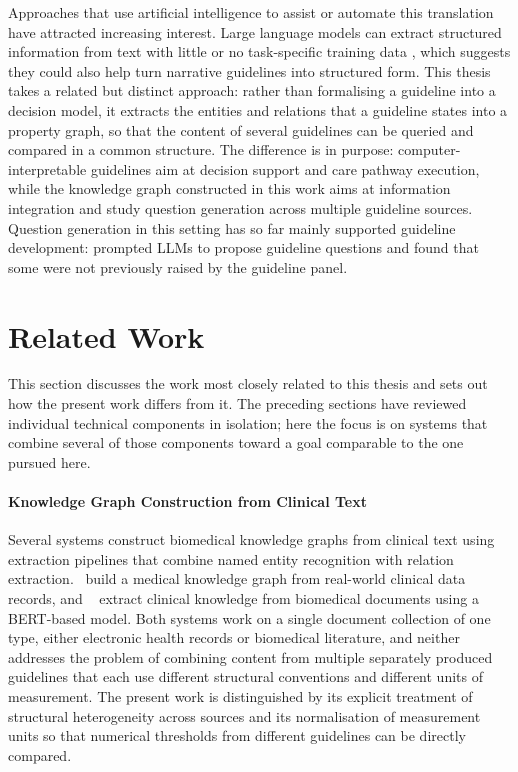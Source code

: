 Approaches that use artificial intelligence to assist or automate this
translation have attracted increasing interest. Large language models can
extract structured information from text with little or no task-specific
training data \cite{xu2024, caufield2024}, which suggests they could also help
turn narrative guidelines into structured form. This thesis takes a related
but distinct approach: rather than formalising a guideline into a decision
model, it extracts the entities and relations that a guideline states into a
property graph, so that the content of several guidelines can be queried and
compared in a common structure. The difference is in purpose:
computer-interpretable guidelines aim at decision support and care pathway
execution, while the knowledge graph constructed in this work aims at
information integration and study question generation across multiple
guideline sources. Question generation in this setting has so far mainly
supported guideline development: \cite{sousa-pinto2024} prompted LLMs to
propose guideline questions and found that some were not previously raised by
the guideline panel.

\section{Related Work}
\label{sec:bg-related}

This section discusses the work most closely related to this thesis and sets
out how the present work differs from it. The preceding sections have
reviewed individual technical components in isolation; here the focus is on
systems that combine several of those components toward a goal comparable to
the one pursued here.

\paragraph{Knowledge Graph Construction from Clinical Text}
\label{sec:bg-related-kg}

Several systems construct biomedical knowledge graphs from clinical text
using extraction pipelines that combine named entity recognition with relation
extraction.~\cite{li2020} build a medical knowledge graph from
real-world clinical data records, and ~\cite{harnoune2021}
extract clinical knowledge from biomedical documents using a BERT-based model.
Both systems work on a single document collection of one type, either
electronic health records or biomedical literature, and neither addresses the
problem of combining content from multiple separately produced guidelines that
each use different structural conventions and different units of measurement.
The present work is distinguished by its explicit treatment of structural
heterogeneity across sources and its normalisation of measurement units so
that numerical thresholds from different guidelines can be directly compared.
